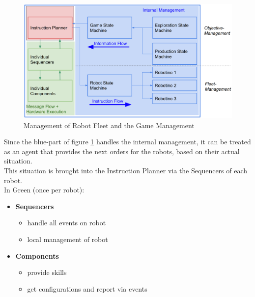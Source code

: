 
\begin{figure}[h]
\centering
\includegraphics[scale=0.23]{pic/Instructionplanner2018.png}
\caption{Management of Robot Fleet and the Game Management}
\label{fig:instr_overview}
\end{figure}
\newpage

Since the blue-part of figure \ref{fig:instr_overview} handles the internal management, it can be treated as an agent that provides the next orders for the robots, based on their actual situation.\\
This situation is brought into the Instruction Planner via the Sequencers of each
robot.\\
In Green (once per robot): \\
\begin{itemize}
    \item \textbf{Sequencers}
    \begin{itemize}
        \item handle all events on robot
        \item local management of robot
    \end{itemize}
    \item \textbf{Components}
    \begin{itemize}
        \item provide skills
        \item get configurations and report via events
    \end{itemize}
\end{itemize}


